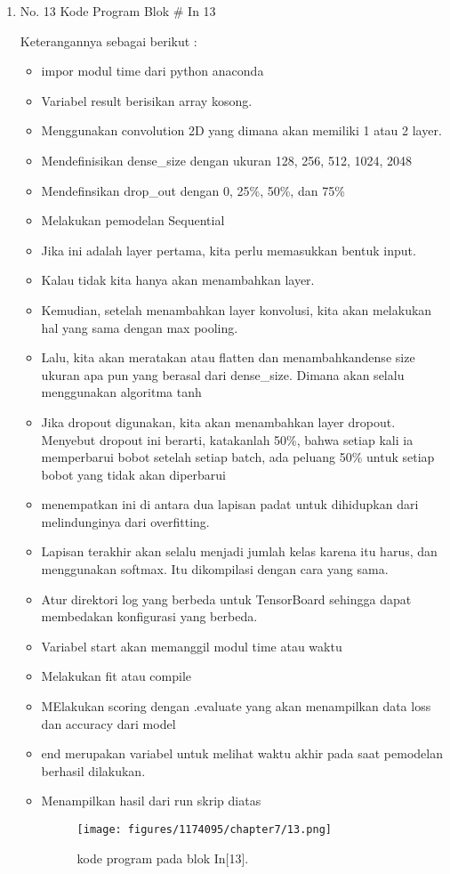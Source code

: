 \begin{enumerate}
\item No. 13 Kode Program Blok \# In 13
\par 
Keterangannya sebagai berikut :
\begin{itemize}
\item impor modul time dari python anaconda
\item Variabel result berisikan array kosong.
\item Menggunakan convolution 2D yang dimana akan memiliki 1 atau 2 layer.
\item Mendefinisikan dense\_size dengan ukuran 128, 256, 512, 1024, 2048
\item Mendefinsikan drop\_out dengan 0, 25\%, 50\%, dan 75\%
\item Melakukan pemodelan Sequential
\item Jika ini adalah layer pertama, kita perlu memasukkan bentuk input.
\item Kalau tidak kita hanya akan menambahkan layer.
\item Kemudian, setelah menambahkan layer konvolusi, kita akan melakukan hal yang sama dengan max pooling.
\item  Lalu, kita akan meratakan atau flatten dan menambahkandense size ukuran apa pun yang berasal dari dense\_size. Dimana akan selalu menggunakan algoritma tanh
\item Jika dropout digunakan, kita akan menambahkan layer dropout. Menyebut dropout ini berarti, katakanlah 50\%, bahwa setiap kali ia memperbarui bobot setelah setiap batch, ada peluang 50\% untuk setiap bobot yang tidak akan diperbarui
\item menempatkan ini di antara dua lapisan padat untuk dihidupkan dari melindunginya dari overfitting.
\item  Lapisan terakhir akan selalu menjadi jumlah kelas karena itu harus, dan menggunakan softmax. Itu dikompilasi dengan cara yang sama.
\item Atur direktori log yang berbeda untuk TensorBoard sehingga dapat membedakan konfigurasi yang berbeda.
\item Variabel start akan memanggil modul time atau waktu
\item Melakukan fit atau compile 
\item MElakukan scoring dengan .evaluate yang akan menampilkan data loss dan accuracy dari model
\item end merupakan variabel untuk melihat waktu akhir pada saat pemodelan berhasil dilakukan.
\item Menampilkan hasil dari run skrip diatas
\begin{figure}[H]
    \texttt{[image: figures/1174095/chapter7/13.png]}
    \centering
    \caption{kode program pada blok  In[13].}
    \end{figure}
\end{itemize}


\end{enumerate}
